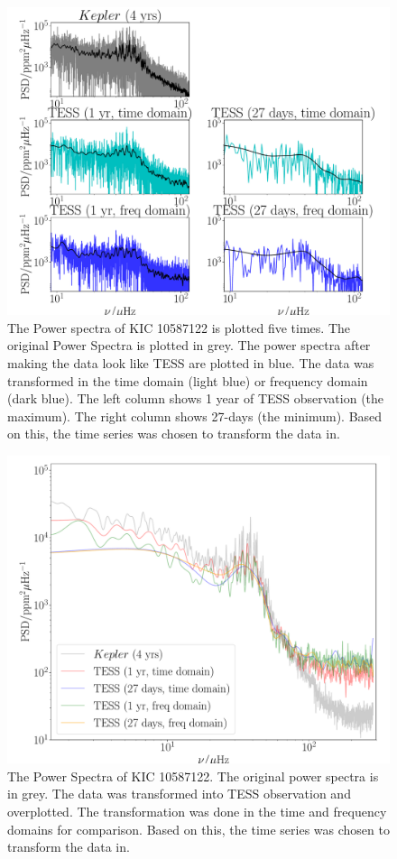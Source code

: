 \documentclass[a4paper,fleqn,usenatbib,useAMS]{mnras}
\begin{document}
\begin{figure}
	\centering
	\includegraphics[scale=0.3]{diagnostic_plot1_modes}
	\caption{The Power spectra of KIC 10587122 is plotted five times. The original Power Spectra is plotted in grey. The power spectra after making the data look like TESS are plotted in blue. The data was transformed in the time domain (light blue) or frequency domain (dark blue). The left column shows 1 year of TESS observation (the maximum). The right column shows 27-days (the minimum). Based on this, the time series was chosen to transform the data in.}	
	\label{Power Spectra}
\end{figure} 
\begin{figure}
	\centering
	\includegraphics[scale=0.3]{diagnostic_plot2_full}
	\caption{The Power Spectra of KIC 10587122. The original power spectra is in grey. The data was transformed into TESS observation and overplotted. The transformation was done in the time and frequency domains for comparison. Based on this, the time series was chosen to transform the data in.}	
	\label{overplotted PS}
\end{figure} 
\end{document}
